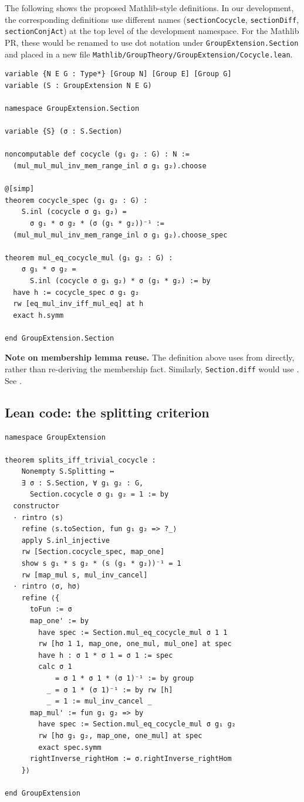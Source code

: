 \documentclass[11pt]{article}
\begin{document}
The following shows the proposed Mathlib-style definitions. In our development, the
corresponding definitions use different names (\texttt{sectionCocycle},
\texttt{sectionDiff}, \texttt{sectionConjAct}) at the top level of the development
namespace. For the Mathlib PR, these would be renamed to use dot notation under
\texttt{GroupExtension.Section} and placed in a new file
\texttt{Mathlib/GroupTheory/GroupExtension/Cocycle.lean}.

\begin{lstlisting}
variable {N E G : Type*} [Group N] [Group E] [Group G]
variable (S : GroupExtension N E G)

namespace GroupExtension.Section

variable {S} (σ : S.Section)

noncomputable def cocycle (g₁ g₂ : G) : N :=
  (mul_mul_mul_inv_mem_range_inl σ g₁ g₂).choose

@[simp]
theorem cocycle_spec (g₁ g₂ : G) :
    S.inl (cocycle σ g₁ g₂) =
      σ g₁ * σ g₂ * (σ (g₁ * g₂))⁻¹ :=
  (mul_mul_mul_inv_mem_range_inl σ g₁ g₂).choose_spec

theorem mul_eq_cocycle_mul (g₁ g₂ : G) :
    σ g₁ * σ g₂ =
      S.inl (cocycle σ g₁ g₂) * σ (g₁ * g₂) := by
  have h := cocycle_spec σ g₁ g₂
  rw [eq_mul_inv_iff_mul_eq] at h
  exact h.symm

end GroupExtension.Section
\end{lstlisting}

\textbf{Note on membership lemma reuse.} The definition above uses
 from  directly, rather
than re-deriving the membership fact. Similarly, \texttt{Section.diff} would use
. See .

\subsection{Lean code: the splitting criterion}

\begin{lstlisting}
namespace GroupExtension

theorem splits_iff_trivial_cocycle :
    Nonempty S.Splitting ↔
    ∃ σ : S.Section, ∀ g₁ g₂ : G,
      Section.cocycle σ g₁ g₂ = 1 := by
  constructor
  · rintro ⟨s⟩
    refine ⟨s.toSection, fun g₁ g₂ => ?_⟩
    apply S.inl_injective
    rw [Section.cocycle_spec, map_one]
    show s g₁ * s g₂ * (s (g₁ * g₂))⁻¹ = 1
    rw [map_mul s, mul_inv_cancel]
  · rintro ⟨σ, hσ⟩
    refine ⟨{
      toFun := σ
      map_one' := by
        have spec := Section.mul_eq_cocycle_mul σ 1 1
        rw [hσ 1 1, map_one, one_mul, mul_one] at spec
        have h : σ 1 * σ 1 = σ 1 := spec
        calc σ 1
            = σ 1 * σ 1 * (σ 1)⁻¹ := by group
          _ = σ 1 * (σ 1)⁻¹ := by rw [h]
          _ = 1 := mul_inv_cancel _
      map_mul' := fun g₁ g₂ => by
        have spec := Section.mul_eq_cocycle_mul σ g₁ g₂
        rw [hσ g₁ g₂, map_one, one_mul] at spec
        exact spec.symm
      rightInverse_rightHom := σ.rightInverse_rightHom
    }⟩

end GroupExtension
\end{lstlisting}
\end{document}
